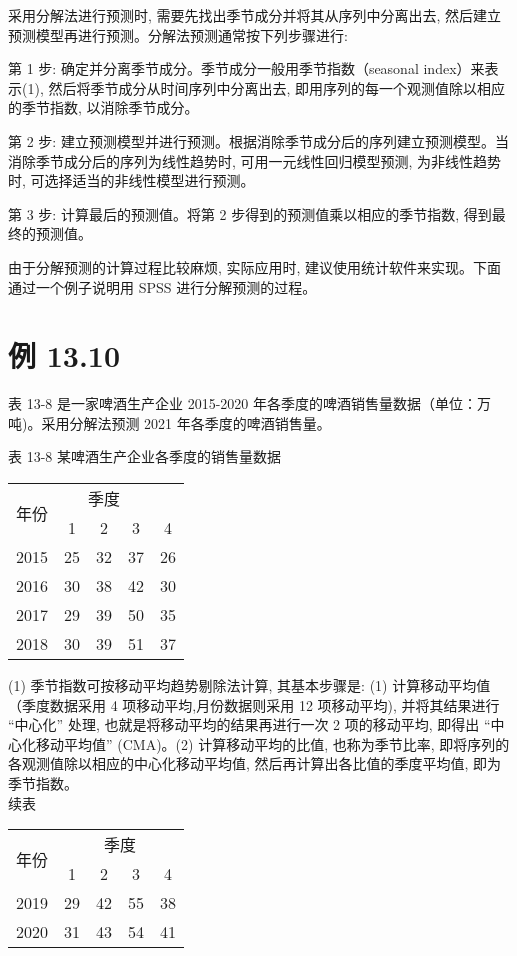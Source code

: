 \documentclass[10pt]{article}
\begin{document}
\begin{CJK*}{UTF8}{bsmi}
采用分解法进行预测时, 需要先找出季节成分并将其从序列中分离出去, 然后建立预测模型再进行预测。分解法预测通常按下列步骤进行:

第 1 步: 确定并分离季节成分。季节成分一般用季节指数（seasonal index）来表示(1), 然后将季节成分从时间序列中分离出去, 即用序列的每一个观测值除以相应的季节指数, 以消除季节成分。

第 2 步: 建立预测模型并进行预测。根据消除季节成分后的序列建立预测模型。当消除季节成分后的序列为线性趋势时, 可用一元线性回归模型预测, 为非线性趋势时, 可选择适当的非线性模型进行预测。

第 3 步: 计算最后的预测值。将第 2 步得到的预测值乘以相应的季节指数, 得到最终的预测值。

由于分解预测的计算过程比较麻烦, 实际应用时, 建议使用统计软件来实现。下面通过一个例子说明用 SPSS 进行分解预测的过程。

\section*{例 13.10}
表 13-8 是一家啤酒生产企业 2015-2020 年各季度的啤酒销售量数据（单位：万吨)。采用分解法预测 2021 年各季度的啤酒销售量。

表 13-8 某啤酒生产企业各季度的销售量数据

\begin{center}
\begin{tabular}{ccccc}
\hline
\multirow{2}{*}{年份} & \multicolumn{3}{c}{季度} &  \\
\cline { 2 - 5 }
 & 1 & 2 & 3 & 4 \\
\hline
2015 & 25 & 32 & 37 & 26 \\
2016 & 30 & 38 & 42 & 30 \\
2017 & 29 & 39 & 50 & 35 \\
2018 & 30 & 39 & 51 & 37 \\
\hline
\end{tabular}
\end{center}

(1) 季节指数可按移动平均趋势剔除法计算, 其基本步骤是: (1) 计算移动平均值（季度数据采用 4 项移动平均,月份数据则采用 12 项移动平均), 并将其结果进行 “中心化” 处理, 也就是将移动平均的结果再进行一次 2 项的移动平均, 即得出 “中心化移动平均值” (CMA)。(2) 计算移动平均的比值, 也称为季节比率, 即将序列的各观测值除以相应的中心化移动平均值, 然后再计算出各比值的季度平均值, 即为季节指数。\\
续表

\begin{center}
\begin{tabular}{ccccc}
\hline
\multirow{2}{*}{年份} & \multicolumn{4}{c}{季度} \\
\cline { 2 - 5 }
 & 1 & 2 & 3 & 4 \\
\hline
2019 & 29 & 42 & 55 & 38 \\
2020 & 31 & 43 & 54 & 41 \\
\hline
\end{tabular}
\end{center}


\end{CJK*}
\end{document}
